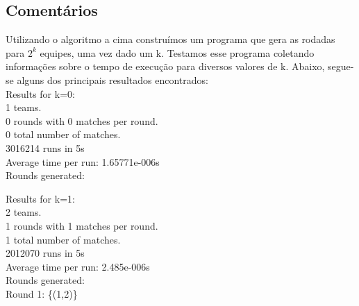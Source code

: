 \documentclass[twoside]{article}
\begin{document}
\begin{multicols}{2}
\subsection{ Comentários }
\indent Utilizando o algoritmo a cima construímos um programa que gera as rodadas para $2^k$ equipes, uma vez dado um k. Testamos esse programa coletando informações sobre o tempo de execução para diversos valores de k. Abaixo, segue-se alguns dos principais resultados encontrados:\\

{\color[rgb]{0,0,1}Results for k=0:}\\
\hspace*{5mm} 1 teams.\\
\hspace*{5mm} 0 rounds with 0 matches per round.\\
\hspace*{5mm} 0 total number of matches.\\
\hspace*{5mm} 3016214 runs in 5s\\
\hspace*{5mm} Average time per run: {\color[rgb]{0.7,0.3,0}1.65771e-006s}\\
{\color[rgb]{0,0.5,0}
\hspace*{5mm} Rounds generated:\\
}

{\color[rgb]{0,0,1}Results for k=1:}\\
\hspace*{5mm} 2 teams.\\
\hspace*{5mm} 1 rounds with 1 matches per round.\\
\hspace*{5mm} 1 total number of matches.\\
\hspace*{5mm} 2012070 runs in 5s\\
\hspace*{5mm} Average time per run:{\color[rgb]{0.7,0.3,0} 2.485e-006s}\\
{\color[rgb]{0,0.5,0}
\hspace*{5mm} Rounds generated:\\
\hspace*{10mm} Round 1: \{(1,2)\}\\
}


\end{multicols}
\end{document}
